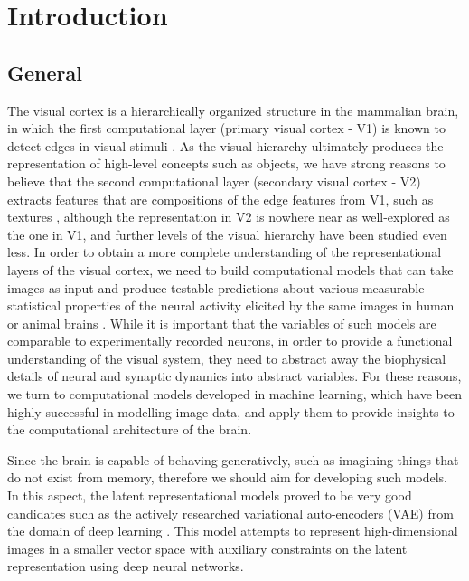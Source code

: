 \documentclass[12pt, english]{article}
\begin{document}
\tableofcontents
\newpage

\section{Introduction}

\vspace{7mm}

\subsection{General}

\vspace{7mm}

\par  The visual cortex is a hierarchically organized structure in the mammalian brain, in which the first computational layer (primary visual cortex - V1) is known to detect edges in visual stimuli \cite{hubel1968receptive}.
As the visual hierarchy ultimately produces the representation of high-level concepts such as objects, we have strong reasons to believe that the second computational layer (secondary visual cortex - V2) extracts features that are compositions of the edge features from V1, such as textures \cite{ZiembaV2}, although the representation in V2 is nowhere near as well-explored as the one in V1, and further levels of the visual hierarchy have been studied even less. In order to obtain a more complete understanding of the representational layers of the visual cortex, we need to build computational models that can take images as input and produce testable predictions about various measurable statistical properties of the neural activity elicited by the same images in human or animal brains \cite{yamins2014performance}.
While it is important that the variables of such models are comparable to experimentally recorded neurons, in order to provide a functional understanding of the visual system, they need to abstract away the biophysical details of neural and synaptic dynamics into abstract variables. For these reasons, we turn to computational models developed in machine learning, which have been highly successful in modelling image data, and apply them to provide insights to the computational architecture of the brain.

\vspace{4mm}

\par Since the brain is capable of behaving generatively, such as imagining things that do not exist from memory, therefore we should aim for developing such models. In this aspect, the latent representational models proved to be very good candidates such as the actively researched variational auto-encoders (VAE) from the domain of deep learning \cite{kingma2013auto}. This model attempts to represent high-dimensional images in a smaller vector space with auxiliary constraints on the latent representation using deep neural networks.
\end{document}
